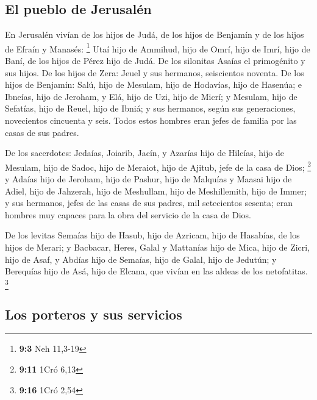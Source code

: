 \hypertarget{el-pueblo-de-jerusaluxe9n}{%
\subsection{El pueblo de Jerusalén}\label{el-pueblo-de-jerusaluxe9n}}

 En Jerusalén vivían de los hijos de Judá, de los hijos de
Benjamín y de los hijos de Efraín y Manasés: \footnote{\textbf{9:3} Neh
  11,3-19}  Utaí hijo de Ammihud, hijo de Omrí, hijo de
Imrí, hijo de Baní, de los hijos de Pérez hijo de Judá. 
De los silonitas Asaías el primogénito y sus hijos.  De
los hijos de Zera: Jeuel y sus hermanos, seiscientos noventa.
 De los hijos de Benjamín: Salú, hijo de Mesulam, hijo de
Hodavías, hijo de Hasenúa;  e Ibneías, hijo de Jeroham, y
Elá, hijo de Uzi, hijo de Micrí; y Mesulam, hijo de Sefatías, hijo de
Reuel, hijo de Ibniá;  y sus hermanos, según sus
generaciones, novecientos cincuenta y seis. Todos estos hombres eran
jefes de familia por las casas de sus padres.

 De los sacerdotes: Jedaías, Joiarib, Jacín,
 y Azarías hijo de Hilcías, hijo de Mesulam, hijo de
Sadoc, hijo de Meraiot, hijo de Ajitub, jefe de la casa de Dios;
\footnote{\textbf{9:11} 1Cró 6,13}  y Adaías hijo de
Jeroham, hijo de Pashur, hijo de Malquías y Maasai hijo de Adiel, hijo
de Jahzerah, hijo de Meshullam, hijo de Meshillemith, hijo de Immer;
 y sus hermanos, jefes de las casas de sus padres, mil
setecientos sesenta; eran hombres muy capaces para la obra del servicio
de la casa de Dios.

 De los levitas Semaías hijo de Hasub, hijo de Azricam,
hijo de Hasabías, de los hijos de Merari;  y Bacbacar,
Heres, Galal y Mattanías hijo de Mica, hijo de Zicri, hijo de Asaf,
 y Abdías hijo de Semaías, hijo de Galal, hijo de
Jedutún; y Berequías hijo de Asá, hijo de Elcana, que vivían en las
aldeas de los netofatitas. \footnote{\textbf{9:16} 1Cró 2,54}

\hypertarget{los-porteros-y-sus-servicios}{%
\subsection{Los porteros y sus
servicios}\label{los-porteros-y-sus-servicios}}


